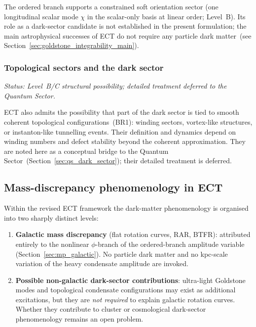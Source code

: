 \documentclass[11pt,a4paper]{article}
\numberwithin{equation}{section}
\begin{document}
The ordered branch supports a constrained soft orientation sector
(one longitudinal scalar mode $\chi$ in the scalar-only basis at
linear order; Level~B).
Its role as a dark-sector candidate is not established in the
present formulation; the main astrophysical successes of ECT
do not require any particle dark matter~(see
Section~\ref{sec:goldstone_integrability_main}).

\subsubsection*{Topological sectors and the dark sector}
\label{sec:ds_topological}

\textit{Status: Level~B/C structural possibility; detailed
treatment deferred to the Quantum Sector.}

ECT also admits the possibility that part of the dark sector is tied
to smooth coherent topological configurations~(BR1): winding sectors,
vortex-like structures, or instanton-like tunnelling events.
Their definition and dynamics depend on winding numbers and defect
stability beyond the coherent approximation. They are noted here
as a conceptual bridge to the Quantum Sector~(Section~\ref{sec:qs_dark_sector});
their detailed treatment is deferred.

\subsection{Mass-discrepancy phenomenology in ECT}

Within the revised ECT framework the dark-matter phenomenology
is organised into two sharply distinct levels:

\begin{enumerate}
\item \textbf{Galactic mass discrepancy} (flat rotation curves,
  RAR, BTFR): attributed entirely to the nonlinear
  $\phi$-branch of the ordered-branch amplitude variable
  (Section~\ref{sec:mp_galactic}).
  No particle dark matter and no kpc-scale variation of the
  heavy condensate amplitude are invoked.

\item \textbf{Possible non-galactic dark-sector contributions}:
  ultra-light Goldstone modes and topological condensate
  configurations may exist as additional excitations,
  but they are \emph{not required} to explain galactic
  rotation curves.  Whether they contribute to cluster or
  cosmological dark-sector phenomenology remains an open
  problem.
\end{enumerate}
\end{document}
